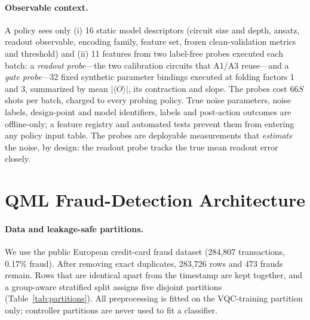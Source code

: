 \documentclass[11pt]{article}
\begin{document}
\paragraph{Observable context.}
A policy sees only (i) 16 static model descriptors (circuit size and depth, ansatz, readout observable, encoding family, feature set, frozen clean-validation metrics and threshold) and (ii) 11 features from two label-free probes executed each batch: a \emph{readout probe}---the two calibration circuits that A1/A3 reuse---and a \emph{gate probe}---32 fixed synthetic parameter bindings executed at folding factors 1 and 3, summarized by mean $|\langle O\rangle|$, its contraction and slope.
The probes cost $66S$ shots per batch, charged to every probing policy.
True noise parameters, noise labels, design-point and model identifiers, labels and post-action outcomes are offline-only; a feature registry and automated tests prevent them from entering any policy input table.
The probes are deployable measurements that \emph{estimate} the noise, by design: the readout probe tracks the true mean readout error closely.

\section{QML Fraud-Detection Architecture}
\label{sec:arch}

\paragraph{Data and leakage-safe partitions.}
We use the public European credit-card fraud dataset \citep{dalpozzolo2015calibrating,mlgulb2018creditcardfraud} (284{,}807 transactions, 0.17\% fraud).
After removing exact duplicates, 283{,}726 rows and 473 frauds remain.
Rows that are identical apart from the timestamp are kept together, and a group-aware stratified split assigns five disjoint partitions (Table~\ref{tab:partitions}).
All preprocessing is fitted on the VQC-training partition only; controller partitions are never used to fit a classifier.
\end{document}
